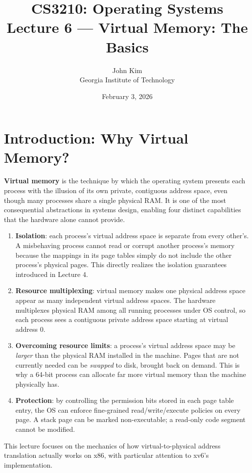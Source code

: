 \documentclass[11pt]{article}
\title{\textbf{CS3210: Operating Systems} \\ Lecture 6 --- Virtual Memory: The Basics}
\author{John Kim \\ Georgia Institute of Technology}
\date{February 3, 2026}
\begin{document}
\maketitle
\tableofcontents
\newpage

\section{Introduction: Why Virtual Memory?}

\textbf{Virtual memory} is the technique by which the operating system presents each process with the illusion of its own private, contiguous address space, even though many processes share a single physical RAM. It is one of the most consequential abstractions in systems design, enabling four distinct capabilities that the hardware alone cannot provide.

\begin{enumerate}
    \item \textbf{Isolation}: each process's virtual address space is separate from every other's. A misbehaving process cannot read or corrupt another process's memory because the mappings in its page tables simply do not include the other process's physical pages. This directly realizes the isolation guarantees introduced in Lecture 4.
    \item \textbf{Resource multiplexing}: virtual memory makes one physical address space appear as many independent virtual address spaces. The hardware multiplexes physical RAM among all running processes under OS control, so each process sees a contiguous private address space starting at virtual address 0.
    \item \textbf{Overcoming resource limits}: a process's virtual address space may be \emph{larger} than the physical RAM installed in the machine. Pages that are not currently needed can be \emph{swapped} to disk, brought back on demand. This is why a 64-bit process can allocate far more virtual memory than the machine physically has.
    \item \textbf{Protection}: by controlling the permission bits stored in each page table entry, the OS can enforce fine-grained read/write/execute policies on every page. A stack page can be marked non-executable; a read-only code segment cannot be modified.
\end{enumerate}

This lecture focuses on the mechanics of how virtual-to-physical address translation actually works on x86, with particular attention to xv6's implementation.
\end{document}
